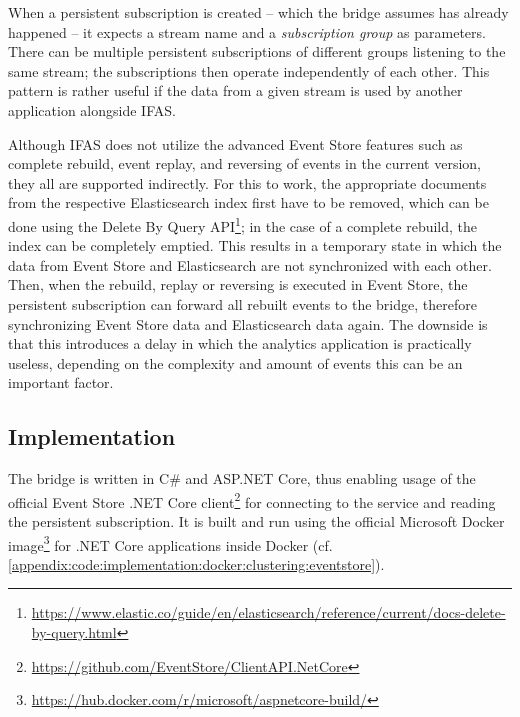 When a persistent subscription is created -- which the bridge assumes has already happened -- it expects a stream name and a \emph{subscription group} as parameters.
There can be multiple persistent subscriptions of different groups listening to the same stream; the subscriptions then operate independently of each other.
This pattern is rather useful if the data from a given stream is used by another application alongside \ac{IFAS}.


Although \ac{IFAS} does not utilize the advanced Event Store features such as complete rebuild, event replay, and reversing of events in the current version, they all are supported indirectly.
For this to work, the appropriate documents from the respective Elasticsearch index first have to be removed, which can be done using the Delete By Query API\footnote{\url{https://www.elastic.co/guide/en/elasticsearch/reference/current/docs-delete-by-query.html}}; in the case of a complete rebuild, the index can be completely emptied.
This results in a temporary state in which the data from Event Store and Elasticsearch are not synchronized with each other.
Then, when the rebuild, replay or reversing is executed in Event Store, the persistent subscription can forward all rebuilt events to the bridge, therefore synchronizing Event Store data and Elasticsearch data again.
The downside is that this introduces a delay in which the analytics application is practically useless, depending on the complexity and amount of events this can be an important factor.

\subsection{Implementation}

The bridge is written in C\# and ASP.NET Core, thus enabling usage of the official Event Store .NET Core client\footnote{\url{https://github.com/EventStore/ClientAPI.NetCore}} for connecting to the service and reading the persistent subscription.
It is built and run using the official Microsoft Docker image\footnote{\url{https://hub.docker.com/r/microsoft/aspnetcore-build/}} for .NET Core applications inside Docker (cf. \cref{appendix:code:implementation:docker:clustering:eventstore}).

